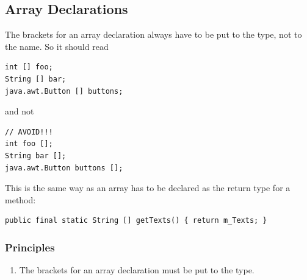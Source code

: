 \subsection{Array Declarations}
The brackets for an array declaration always have to be put to the type, not to the name.
So it should read
\begin{lstlisting}
int [] foo;
String [] bar;
java.awt.Button [] buttons;
\end{lstlisting}
and not
\begin{lstlisting}
// AVOID!!!
int foo [];
String bar [];
java.awt.Button buttons [];
\end{lstlisting}
This is the same way as an array has to be declared as the return type for a method:
\begin{lstlisting}
public final static String [] getTexts() { return m_Texts; }
\end{lstlisting}

\subsubsection{Principles}
\begin{enumerate}[label=P\arabic*.]
\item{The brackets for an array declaration must be put to the type.}
\end{enumerate}

